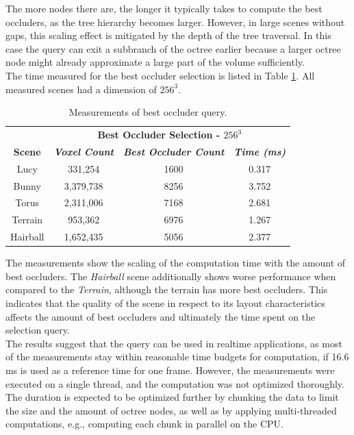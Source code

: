 \documentclass[conference]{IEEEtran}
\begin{document}
\noindent
The more nodes there are, the longer it typically takes to compute the best occluders, as the tree 
hierarchy becomes larger. However, in large scenes without gaps, this scaling effect is mitigated 
by the depth of the tree traversal. In this case the query can exit a subbranch of the octree 
earlier because a larger octree node might already approximate a large part of the volume sufficiently. \\

\noindent
The time measured for the best occluder selection is listed in Table \ref{tab:best-occluder-query}. 
All measured scenes had a dimension of $256^3$.

\begin{table}[htbp]
    \caption{Measurements of best occluder query.}
    \begin{center}
        \begin{tabular}{|c|c|c|c|}
            \hline
            \textbf{}&\multicolumn{3}{|c|}{\textbf{Best Occluder Selection - $256^3$}} \\
            \cline{2-4} 
            \textbf{Scene} & \textbf{\textit{Voxel Count}}& \textbf{\textit{Best Occluder Count}}& \textbf{\textit{Time (ms)}} \\
            \hline
            Lucy        & 331,254   & 1600 & 0.317 \\
            Bunny       & 3,379,738 & 8256 & 3.752 \\
            Torus       & 2,311,006 & 7168 & 2.681 \\
            Terrain     & 953,362   & 6976 & 1.267 \\
            Hairball    & 1,652,435 & 5056 & 2.377 \\
            \hline
        \end{tabular}
    \label{tab:best-occluder-query}
    \end{center}
\end{table}

\noindent
The measurements show the scaling of the computation time with the amount of best occluders. The \emph{Hairball} 
scene additionally shows worse performance when compared to the \emph{Terrain}, although the terrain has more 
best occluders. This indicates that the quality of the scene in respect to its layout characteristics affects the 
amount of best occluders and ultimately the time spent on the selection query.\\

\noindent
The results suggest that the query can be used in realtime applications, as most of the measurements stay 
within reasonable time budgets for computation, if 16.6 ms is used as a reference time for one frame. However, 
the measurements were executed on a single thread, and the computation was not optimized thoroughly. The 
duration is expected to be optimized further by chunking the data to limit the size and the amount of octree 
nodes, as well as by applying multi-threaded computations, e.g., computing each chunk in parallel on the \ac{CPU}.
\end{document}
